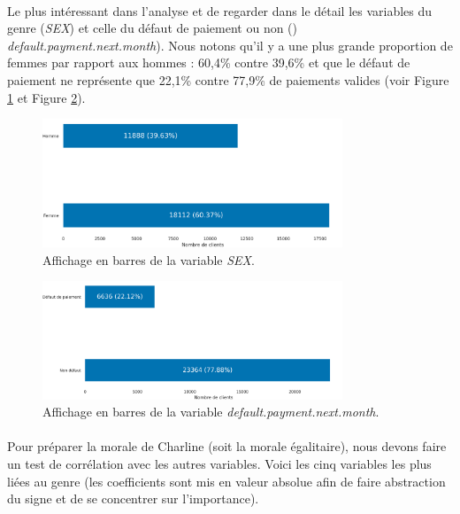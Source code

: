 \documentclass[10pt, french, a4paper]{report}
\begin{document}
\paragraph{}
Le plus intéressant dans l'analyse et de regarder dans le détail les variables du genre (\textit{SEX}) et celle du défaut de paiement ou non ()\textit{	default.payment.next.month}). Nous notons qu'il y a une plus grande proportion de femmes par rapport aux hommes : 60,4\% contre 39,6\% et que le défaut de paiement ne représente que 22,1\% contre 77,9\% de paiements valides (voir Figure \ref{fig:sex} et Figure \ref{fig:target}).

\begin{figure}[hbt!]
  \centering
  \includegraphics[width=0.8\textwidth]{images/SEX.png}
  \caption{Affichage en barres de la variable \textit{SEX}.}
  \label{fig:sex}
\end{figure}
\begin{figure}[hbt!]
  \centering
  \includegraphics[width=0.8\textwidth]{images/target.png}
  \caption{Affichage en barres de la variable \textit{default.payment.next.month}.}
  \label{fig:target}
\end{figure}

\paragraph{}
Pour préparer la morale de Charline (soit la morale égalitaire), nous devons faire un test de corrélation avec les autres variables. Voici les cinq variables les plus liées au genre (les coefficients sont mis en valeur absolue afin de faire abstraction du signe et de se concentrer sur l'importance).
\end{document}
